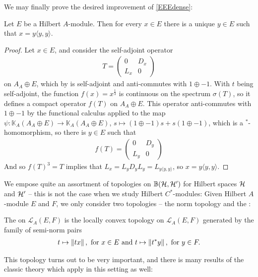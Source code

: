 We may finally prove the desired improvement of \cref{EEEdense}:
\begin{proposition}
	Let $E$ be a Hilbert $A$-module. Then for every $x \in E$ there is a unique $y \in E$ such that $x = y \langle y , y \rangle$.
	\label{mult:EeqEEE}
\end{proposition}
\begin{proof}
	Let $x \in E$, and consider the self-adjoint operator
	\begin{align*}
		T = \begin{pmatrix}
			0 & D_x \\
			L_x & 0
		\end{pmatrix}
	\end{align*}
	on $A_A \oplus E$, which by  is self-adjoint and anti-commutes with $1 \oplus -1$. With $t$ being self-adjoint, the function $f(x) = x^{\frac13}$ is continuous on the spectrum $\sigma(T)$, so it defines a compact operator $f(T)$ on $A_A \oplus E$. This operator anti-commutes with $1 \oplus -1$ by the functional calculus applied to the map $\psi \colon \mathbb{K}_A(A_A \oplus E) \to \mathbb{K}_A(A_A \oplus E)$, $s \mapsto (1 \oplus -1) s + s(1 \oplus -1)$, which is a $^*$-homomorphism, so there is $y \in E$ such that
	\begin{align*}
		f(T) = \begin{pmatrix}
			0 & D_y \\
			L_y & 0
		\end{pmatrix}
	\end{align*}
	And so $f(T)^3 = T$ implies that $L_x = L_y D_y L_y = L_{y \langle y,y \rangle}$, so $x = y \langle y, y \rangle$.
\end{proof}
We empose quite an assortment of topologies on $\mathbb{B}(\mathcal{H},\mathcal{H}')$ for Hilbert spaces $\mathcal{H}$ and $\mathcal{H}'$ -- this is not the case when we study Hilbert $C^*$-modules: Given Hilbert $A$-module $E$ and $F$, we only consider two topologies -- the norm topology and the :
\begin{definition}
	The  on $\mathcal{L}_A(E,F)$ is the locally convex topology on $\mathcal{L}_A(E,F)$ generated by the family of semi-norm pairs
	\begin{align*}
		t \mapsto \left\lVert tx\right\rVert, \text{ for } x \in E \text{ and }		t \mapsto \left\lVert t^*y \right\rVert, \text{ for } y \in F.
	\end{align*}
\end{definition}
This topology turns out to be very important, and there is many results of the classic theory which apply in this setting as well:
